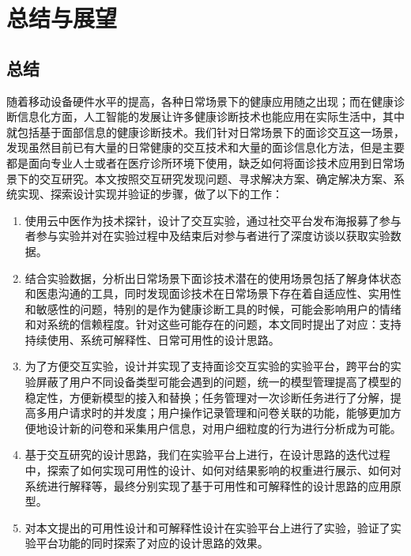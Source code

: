 \chapter{总结与展望}
\section{总结}
随着移动设备硬件水平的提高，各种日常场景下的健康应用随之出现；而在健康诊断信息化方面，人工智能的发展让许多健康诊断技术也能应用在实际生活中，其中就包括基于面部信息的健康诊断技术。我们针对日常场景下的面诊交互这一场景，发现虽然目前已有大量的日常健康的交互技术和大量的面诊信息化方法，但是主要都是面向专业人士或者在医疗诊所环境下使用，缺乏如何将面诊技术应用到日常场景下的交互研究。本文按照交互研究发现问题、寻求解决方案、确定解决方案、系统实现、探索设计实现并验证的步骤，做了以下的工作：

\begin{enumerate}
	\item 使用云中医作为技术探针，设计了交互实验，通过社交平台发布海报募了参与者参与实验并对在实验过程中及结束后对参与者进行了深度访谈以获取实验数据。
	
	\item 结合实验数据，分析出日常场景下面诊技术潜在的使用场景包括了解身体状态和医患沟通的工具，同时发现面诊技术在日常场景下存在着自适应性、实用性和敏感性的问题，特别的是作为健康诊断工具的时候，可能会影响用户的情绪和对系统的信赖程度。针对这些可能存在的问题，本文同时提出了对应：支持持续使用、系统可解释性、日常可用性的设计思路。

	\item 为了方便交互实验，设计并实现了支持面诊交互实验的实验平台，跨平台的实验屏蔽了用户不同设备类型可能会遇到的问题，统一的模型管理提高了模型的稳定性，方便新模型的接入和替换；任务管理对一次诊断任务进行了分解，提高多用户请求时的并发度；用户操作记录管理和问卷关联的功能，能够更加方便地设计新的问卷和采集用户信息，对用户细粒度的行为进行分析成为可能。
	
	\item 基于交互研究的设计思路，我们在实验平台上进行，在设计思路的迭代过程中，探索了如何实现可用性的设计、如何对结果影响的权重进行展示、如何对系统进行解释等，最终分别实现了基于可用性和可解释性的设计思路的应用原型。

	\item 对本文提出的可用性设计和可解释性设计在实验平台上进行了实验，验证了实验平台功能的同时探索了对应的设计思路的效果。
\end{enumerate}



